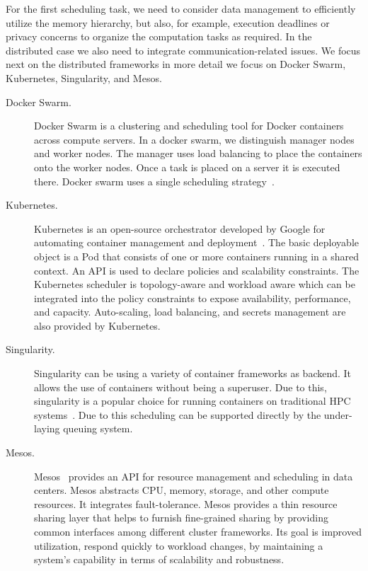 \documentclass[final,5p,times,twocolumn]{elsarticle}
\begin{document}
For the first scheduling task, we need to consider data management to efficiently utilize the memory hierarchy, but also, for example, execution deadlines or privacy concerns to organize the computation tasks as required. In the distributed case we also need to integrate communication-related issues. We focus next on the distributed frameworks in more detail we focus on Docker Swarm, Kubernetes, Singularity, and Mesos.

\begin{description}


\item[Docker Swarm.] Docker Swarm is a clustering and scheduling tool for Docker containers~\cite{Dockerswarmengine2018} across compute servers. In a docker swarm, we distinguish manager nodes and worker nodes. The manager uses load balancing to place the containers onto the worker nodes. Once a task is placed on a server it is executed there. Docker swarm uses a single scheduling strategy~\cite{Dockerswarm2018}.



\item[Kubernetes.] Kubernetes is an open-source orchestrator developed by Google for automating container management and deployment~\cite{Kubernates2018}. The basic deployable object is a Pod that consists of one or more containers running in a shared context. An API is used to declare policies and scalability constraints. The Kubernetes scheduler is topology-aware and workload aware which can be integrated into the policy constraints to expose availability, performance, and capacity. Auto-scaling, load balancing, and secrets management are also provided by Kubernetes.

\item[Singularity.] Singularity can be using a variety of container frameworks as backend. It allows the use of containers without being a superuser. Due to this, singularity is a popular choice for running containers on traditional HPC systems~\cite{www-singularity}. Due to this scheduling can be supported directly by the under-laying queuing system.


\item[Mesos.] Mesos~\cite{hindman2011mesos,Mesos2018} provides an API for resource management and scheduling in data centers. Mesos abstracts CPU, memory, storage, and other compute resources. It integrates fault-tolerance. Mesos provides a thin resource sharing layer that helps to furnish fine-grained sharing by providing common interfaces among different cluster frameworks. Its goal is improved utilization, respond quickly to workload changes, by maintaining a system's capability in terms of scalability and robustness.



\end{description}
\end{document}
